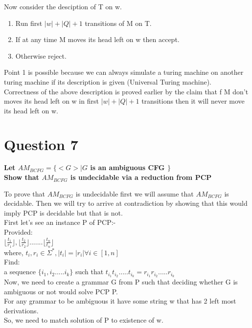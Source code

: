 \documentclass{article}
\begin{document}
Now consider the desciption of T on w.\\
\begin{enumerate}
    \item Run first $|w| + |Q| + 1$ transitions of M on T.
    \item If at any time M moves its head left on w then accept.
    \item Otherwise reject.
\end{enumerate}


Point 1 is possible because we can always simulate a turing machine on another turing machine if its description is given (Universal Turing machine).\\
Correctness of the above description is proved earlier by the claim that f M don't moves its head left on w in first $|w| + |Q| + 1$ transitions then it will never move its head left on w.\\
\pagebreak


\section{Question 7}

\textbf{Let $AM_{BCFG} = \{< G > | G$ is an ambiguous CFG $\}$ \\
    Show that $AM_{BCFG}$ is undecidable via a reduction from PCP\\}

To prove that $AM_{BCFG}$ is undecidable first we will assume that $AM_{BCFG}$ is decidable. Then 
we will try to arrive at contradiction by showing that this would imply PCP is decidable but that is not.\\

First let's see an instance P of PCP:- \\

Provided:\\
$\lfloor \frac{t_1}{r_1} \rfloor , \lfloor \frac{t_2}{r_2} \rfloor ....... \lfloor \frac{t_n}{t_n} \rfloor$ \\
where, $t_i , r_i \in \Sigma^* , |t_i| = |r_i| \forall i \in [1,n]$\\

Find:\\
a sequence $\{ i_1,i_2.....i_k \}$ such that $t_{i_1}t_{i_2}.....t_{i_k} = r_{i_1}r_{i_2}.....r_{i_k}$\\

Now, we need to create a grammar G from P such that deciding whether G is  ambiguous or not would solve PCP P.\\
For any grammar to be ambiguous it have some string w that has 2 left most derivations.\\
So, we need to match solution of P to existence of w.\\
\end{document}
